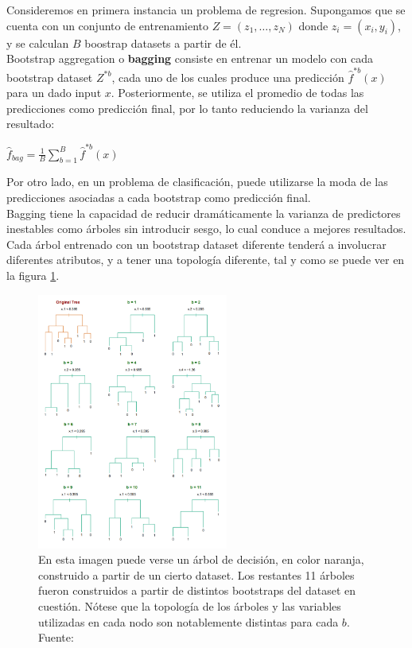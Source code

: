 Consideremos en primera instancia un problema de regresion. Supongamos que se cuenta con un conjunto de entrenamiento $Z=(z_1, \ldots, z_N)$ donde $z_i=(x_i,y_i)$, y se calculan  $B$ boostrap datasets a partir de él. \\

Bootstrap aggregation o \textbf{bagging} \cite{breiman96} consiste en entrenar un modelo con cada bootstrap dataset $Z^{*b}$, cada uno de los cuales produce una predicción $\hat{f}^{*b}(x)$ para un dado input $x$. Posteriormente, se utiliza el promedio de todas las predicciones como predicción final, por lo tanto reduciendo la varianza del resultado:

\begin{center}
$\hat{f}_{bag} = \frac{1}{B} \sum\limits_{b=1}^B \hat{f}^{*b}(x)$
\end{center}

Por otro lado, en un problema de clasificación, puede utilizarse la moda de las predicciones asociadas a cada bootstrap como predicción final. \\

Bagging tiene la capacidad de reducir dramáticamente la varianza de predictores inestables como árboles sin introducir sesgo, lo cual conduce a mejores resultados. Cada árbol entrenado con un bootstrap dataset diferente tenderá a involucrar diferentes atributos, y a tener una topología diferente, tal y como se puede ver en la figura \ref{fig:bootstrap_trees}. 

\begin{figure}[h!]
\begin{center}
  \includegraphics[width=0.56\textwidth]{Kap1/bootstrap_trees.png} 
\end{center}
\caption{ En esta imagen puede verse un árbol de decisión, en color naranja, construido a partir de un cierto dataset. Los restantes 11 árboles fueron construidos a partir de distintos bootstraps del dataset en cuestión. Nótese que la topología de los árboles y las variables utilizadas en cada nodo son notablemente distintas para cada $b$. Fuente: \protect\cite{statisticallearning} }
\label{fig:bootstrap_trees}
\end{figure}


